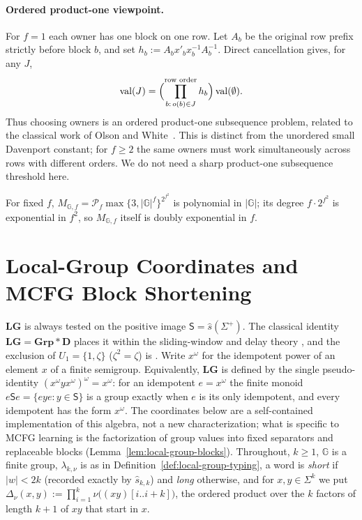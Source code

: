 \documentclass[11pt]{article}
\numberwithin{equation}{section}
\theoremstyle{plain}
\theoremstyle{definition}
\theoremstyle{remark}
\theoremstyle{plain}
\begin{document}
\paragraph{Ordered product-one viewpoint.}
For $f=1$ each owner has one block on one row.  Let $A_b$ be the original
row prefix strictly before block $b$, and set
$h_b:=A_bx'_bx_b^{-1}A_b^{-1}$.  Direct cancellation gives, for any $J$,
\[
 \operatorname{val}(J)=
 \Bigl(\prod_{b:\,o(b)\in J}^{\text{row order}}h_b\Bigr)
 \operatorname{val}(\emptyset).
\]
Thus choosing owners is an ordered product-one subsequence problem,
related to the classical work of Olson and White~\cite{OlsonWhite1977}.
This is distinct from the unordered small Davenport constant; for $f\ge2$
the same owners must work simultaneously across rows with different orders.
We do not need a sharp product-one subsequence threshold here.

For fixed $f$, $M_{{\mathbb G},f}=\mathcal P_f\max\{3,|{\mathbb G}|^f\}^{2^{f^2}}$ is polynomial in $|{\mathbb G}|$; its
degree $f\cdot2^{f^2}$ is exponential in $f^2$, so $M_{{\mathbb G},f}$ itself is doubly
exponential in $f$.

\section{Local-Group Coordinates and MCFG Block Shortening}
\label{app:local-group}

$\mathbf{LG}$ is always tested on the positive image $\mathsf S=\widehat s(\Sigma^+)$.  The
classical identity $\mathbf{LG}=\mathbf{Grp}*\mathbf D$ places it within the
sliding-window and delay theory \cite{Straubing1985,Tilson1987}, and the exclusion of
$U_1=\{1,\zeta\}$ ($\zeta^2=\zeta$) is \cite[Proposition~2.3]{AlmeidaEtAl2009}.
Write $x^\omega$ for the idempotent power of an element $x$ of a finite semigroup.
Equivalently, $\mathbf{LG}$ is defined by the single pseudo-identity
$(x^\omega yx^\omega)^\omega=x^\omega$: for an idempotent $e=x^\omega$ the finite monoid
$e\mathsf Se=\{eye:y\in\mathsf S\}$ is a group exactly when $e$ is its only idempotent, and
every idempotent has the form $x^\omega$.
The coordinates below are a self-contained implementation of this algebra, not a
new characterization; what is specific to MCFG learning is the factorization of group
values into fixed separators and replaceable blocks
(Lemma~\ref{lem:local-group-blocks}).  Throughout, $k\ge1$, ${\mathbb G}$ is a finite group,
$\lambda_{k,\nu}$ is as in Definition~\ref{def:local-group-typing}, a word is
\emph{short} if $|w|<2k$ (recorded exactly by $\widehat s_{k,k}$) and \emph{long}
otherwise, and for $x,y\in\Sigma^k$ we put
$\Delta_\nu(x,y):=\prod_{i=1}^{k}\nu\bigl((xy)[i..i+k]\bigr)$, the ordered product over
the $k$ factors of length $k+1$ of $xy$ that start in $x$.
\end{document}
